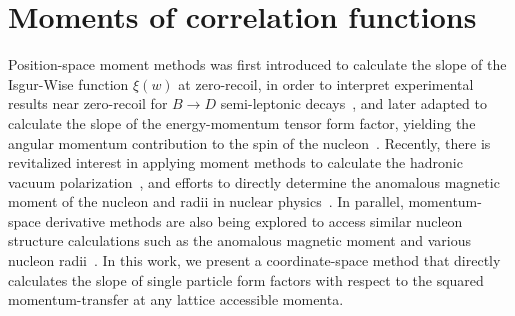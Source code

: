 \documentclass[prd,aps,twocolumn,superscriptaddress,tightenlines,nofootinbib,floatfix,preprintnumbers,10pt]{revtex4-1}
\begin{document}
\section{Moments of correlation functions}
Position-space moment methods was first introduced to
calculate the slope of the Isgur-Wise function $\xi (w)$ at
zero-recoil, in order to interpret experimental results near
zero-recoil for $B \rightarrow D$ semi-leptonic
decays~\cite{Lellouch:1994zu}, and later adapted to calculate the
slope of the energy-momentum tensor form factor, yielding the angular
momentum contribution to the spin of the
nucleon~\cite{Mathur:1999uf,Gadiyak:2001fe}. Recently, there is
revitalized interest in applying moment methods to calculate the
hadronic vacuum polarization~\cite{Chakraborty:2016mwy,Blum:2016xpd},
and efforts to directly determine the anomalous magnetic moment of the
nucleon and radii in nuclear physics~\cite{Alexandrou:2016rbj}. In
parallel, momentum-space derivative methods are also being explored to
access similar nucleon structure calculations such as the anomalous
magnetic moment and various nucleon
radii~\cite{deDivitiis:2012vs,Tiburzi:2014yra}. In this work, we
present a coordinate-space method that directly calculates the slope
of single particle form factors with respect to the squared
momentum-transfer at any lattice accessible momenta.
\end{document}
